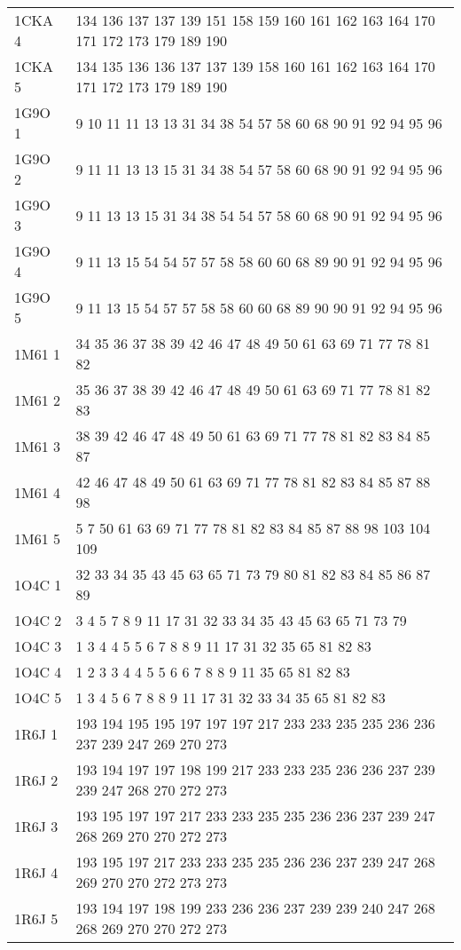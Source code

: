 \begin{table}[!htbp]
\begin{tabular}{ll}
        1CKA 4 & 134 136 137 137 139 151 158 159 160 161 162 163 164 170 171 172 173 179 189 190 \\
        1CKA 5 & 134 135 136 136 137 137 139 158 160 161 162 163 164 170 171 172 173 179 189 190 \\
        1G9O 1 & 9 10 11 11 13 13 31 34 38 54 57 58 60 68 90 91 92 94 95 96 \\
        1G9O 2 & 9 11 11 13 13 15 31 34 38 54 57 58 60 68 90 91 92 94 95 96 \\
        1G9O 3 & 9 11 13 13 15 31 34 38 54 54 57 58 60 68 90 91 92 94 95 96 \\
        1G9O 4 & 9 11 13 15 54 54 57 57 58 58 60 60 68 89 90 91 92 94 95 96 \\
        1G9O 5 & 9 11 13 15 54 57 57 58 58 60 60 68 89 90 90 91 92 94 95 96 \\
        1M61 1 & 34 35 36 37 38 39 42 46 47 48 49 50 61 63 69 71 77 78 81 82 \\
        1M61 2 & 35 36 37 38 39 42 46 47 48 49 50 61 63 69 71 77 78 81 82 83 \\
        1M61 3 & 38 39 42 46 47 48 49 50 61 63 69 71 77 78 81 82 83 84 85 87 \\
        1M61 4 & 42 46 47 48 49 50 61 63 69 71 77 78 81 82 83 84 85 87 88 98 \\
        1M61 5 & 5 7 50 61 63 69 71 77 78 81 82 83 84 85 87 88 98 103 104 109 \\
        1O4C 1 & 32 33 34 35 43 45 63 65 71 73 79 80 81 82 83 84 85 86 87 89 \\
        1O4C 2 & 3 4 5 7 8 9 11 17 31 32 33 34 35 43 45 63 65 71 73 79 \\
        1O4C 3 & 1 3 4 4 5 5 6 7 8 8 9 11 17 31 32 35 65 81 82 83 \\
        1O4C 4 & 1 2 3 3 4 4 5 5 6 6 7 8 8 9 11 35 65 81 82 83 \\
        1O4C 5 & 1 3 4 5 6 7 8 8 9 11 17 31 32 33 34 35 65 81 82 83 \\
        1R6J 1 & 193 194 195 195 197 197 197 217 233 233 235 235 236 236 237 239 247 269 270 273 \\
        1R6J 2 & 193 194 197 197 198 199 217 233 233 235 236 236 237 239 239 247 268 270 272 273 \\
        1R6J 3 & 193 195 197 197 217 233 233 235 235 236 236 237 239 247 268 269 270 270 272 273 \\
        1R6J 4 & 193 195 197 217 233 233 235 235 236 236 237 239 247 268 269 270 270 272 273 273 \\
        1R6J 5 & 193 194 197 198 199 233 236 236 237 239 239 240 247 268 268 269 270 270 272 273 \\

\end{tabular}
\end{table}
